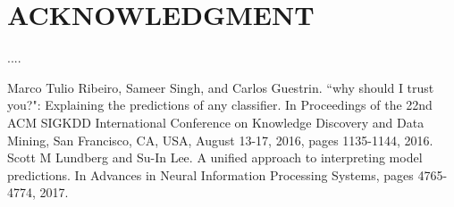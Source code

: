 \documentclass[letterpaper, 10 pt, conference]{ieeeconf}  %
\begin{document}

\section*{ACKNOWLEDGMENT}

....



\begin{thebibliography}{99}

 Marco Tulio Ribeiro, Sameer Singh, and Carlos Guestrin. ``why should I trust you?": Explaining the predictions of any classifier. In Proceedings of the 22nd ACM SIGKDD International Conference on Knowledge Discovery and Data Mining, San Francisco, CA, USA, August 13-17, 2016, pages 1135-1144, 2016.
 Scott M Lundberg and Su-In Lee. A unified approach to interpreting model predictions. In Advances in Neural Information Processing Systems, pages 4765-4774, 2017.
\end{thebibliography}
\end{document}
